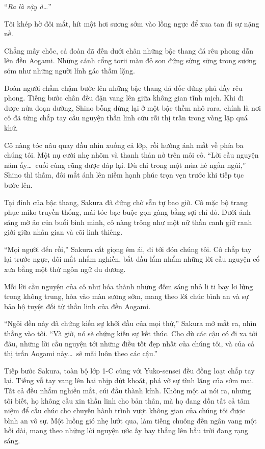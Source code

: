 \documentclass[../main.tex]{subfiles}
\begin{document}
``\textit{Ra là vậy à\dots}''

Tôi khép hờ đôi mắt, hít một hơi sương sớm vào lồng ngực để xua tan đi sự nặng nề.

\ct

Chẳng mấy chốc, cả đoàn đã đến dưới chân những bậc thang đá rêu phong dẫn lên đền Aogami. Những cánh cổng torii màu đỏ son đứng sừng sững trong sương sớm như những người lính gác thầm lặng.

Đoàn người chầm chậm bước lên những bậc thang đá dốc đứng phủ đầy rêu phong. Tiếng bước chân đều đặn vang lên giữa không gian tĩnh mịch. Khi đi được nửa đoạn đường, Shino bỗng dừng lại ở một bậc thềm nhô rara, chính là nơi cô đã từng chắp tay cầu nguyện thần linh cứu rỗi thị trấn trong vòng lặp quá khứ.

Cô nàng tóc nâu quay đầu nhìn xuống cả lớp, rồi hướng ánh mắt về phía ba chúng tôi. Một nụ cười nhẹ nhõm và thanh thản nở trên môi cô. ``Lời cầu nguyện năm ấy\dots\ cuối cùng cũng được đáp lại. Dù chỉ trong một mùa hè ngắn ngủi,'' Shino thì thầm, đôi mắt ánh lên niềm hạnh phúc trọn vẹn trước khi tiếp tục bước lên.

Tại đỉnh của bậc thang, Sakura đã đứng chờ sẵn tự bao giờ. Cô mặc bộ trang phục miko truyền thống, mái tóc bạc buộc gọn gàng bằng sợi chỉ đỏ. Dưới ánh sáng mờ ảo của buổi bình minh, cô nàng trông như một nữ thần canh giữ ranh giới giữa nhân gian và cõi linh thiêng.

``Mọi người đến rồi,'' Sakura cất giọng êm ái, đi tới đón chúng tôi. Cô chắp tay lại trước ngực, đôi mắt nhắm nghiền, bắt đầu lẩm nhẩm những lời cầu nguyện cổ xưa bằng một thứ ngôn ngữ du dương.

Mỗi lời cầu nguyện của cô như hóa thành những đốm sáng nhỏ li ti bay lơ lửng trong không trung, hòa vào màn sương sớm, mang theo lời chúc bình an và sự bảo hộ tuyệt đối từ thần linh của đền Aogami.

``Ngôi đền này đã chứng kiến sự khởi đầu của mọi thứ,'' Sakura mở mắt ra, nhìn thẳng vào tôi. ``Và giờ, nó sẽ chứng kiến sự kết thúc. Cho dù các cậu có đi xa tới đâu, những lời cầu nguyện tới những điều tốt đẹp nhất của chúng tôi, và của cả thị trấn Aogami này\dots\ sẽ mãi luôn theo các cậu.''

Tiếp bước Sakura, toàn bộ lớp 1-C cùng với Yuko-sensei đều đồng loạt chắp tay lại. Tiếng vỗ tay vang lên hai nhịp dứt khoát, phá vỡ sự tĩnh lặng của sớm mai. Tất cả đều nhắm nghiền mắt, cúi đầu thành kính. Không một ai nói ra, nhưng tôi biết, họ không cầu xin thần linh cho bản thân, mà họ đang dồn tất cả tâm niệm để cầu chúc cho chuyến hành trình vượt không gian của chúng tôi được bình an vô sự. Một luồng gió nhẹ lướt qua, làm tiếng chuông đền ngân vang một hồi dài, mang theo những lời nguyện ước ấy bay thẳng lên bầu trời đang rạng sáng.
\end{document}
